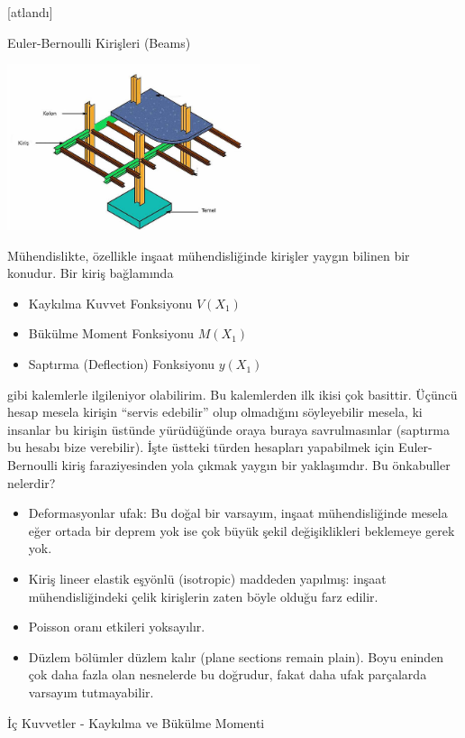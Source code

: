 \documentclass[12pt,fleqn]{article}\usepackage{../../common}
\begin{document}
[atlandı]

Euler-Bernoulli Kirişleri (Beams)

\includegraphics[width=20em]{phy_020_strs_02_09.jpg}

Mühendislikte, özellikle inşaat mühendisliğinde kirişler yaygın bilinen
bir konudur. Bir kiriş bağlamında

\begin{itemize}
   \item Kaykılma Kuvvet Fonksiyonu $V(X_1)$
   \item Bükülme Moment Fonksiyonu $M(X_1)$
   \item Saptırma (Deflection) Fonksiyonu $y(X_1)$
\end{itemize}

gibi kalemlerle ilgileniyor olabilirim. Bu kalemlerden ilk ikisi çok basittir.
Üçüncü hesap mesela kirişin ``servis edebilir'' olup olmadığını söyleyebilir
mesela, ki insanlar bu kirişin üstünde yürüdüğünde oraya buraya savrulmasınlar
(saptırma bu hesabı bize verebilir). İşte üstteki türden hesapları yapabilmek
için Euler-Bernoulli kiriş faraziyesinden yola çıkmak yaygın bir yaklaşımdır.
Bu önkabuller nelerdir? 

\begin{itemize}
   \item Deformasyonlar ufak: Bu doğal bir varsayım, inşaat mühendisliğinde
     mesela eğer ortada bir deprem yok ise çok büyük şekil değişiklikleri
     beklemeye gerek yok. 
   \item Kiriş lineer elastik eşyönlü (isotropic) maddeden yapılmış: inşaat
     mühendisliğindeki çelik kirişlerin zaten böyle olduğu farz edilir.
   \item Poisson oranı etkileri yoksayılır.
   \item Düzlem bölümler düzlem kalır (plane sections remain plain). Boyu
     eninden çok daha fazla olan nesnelerde bu doğrudur, fakat daha ufak
     parçalarda varsayım tutmayabilir.
\end{itemize}

İç Kuvvetler - Kaykılma ve Bükülme Momenti
\end{document}
